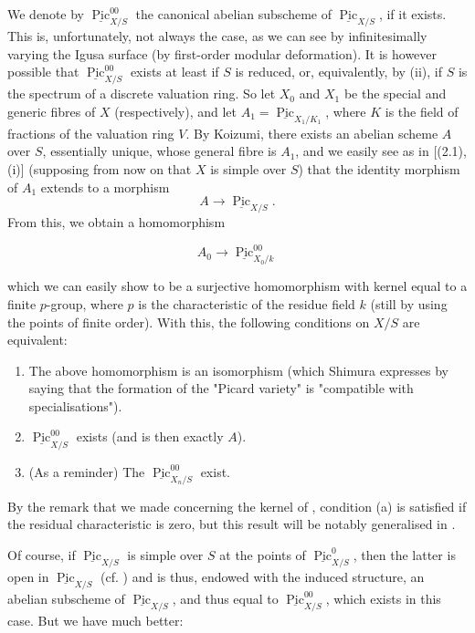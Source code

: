 \begin{remark}\label{fga3.vi-3-remarks-3.4}
    We denote by $\underline{\operatorname{Pic}}_{X/S}^{00}$ the canonical abelian subscheme of $\underline{\operatorname{Pic}}_{X/S}$, if it exists.
    This is, unfortunately, not always the case, as we can see by infinitesimally varying the Igusa surface (by first-order modular deformation).
    It is however possible that $\underline{\operatorname{Pic}}_{X/S}^{00}$ exists at least if $S$ is reduced, or, equivalently, by (ii), if $S$ is the spectrum of a discrete valuation ring.
    So let $X_0$ and $X_1$ be the special and generic fibres of $X$ (respectively), and let $A_1=\underline{\operatorname{Pic}}_{X_1/K_1}$, where $K$ is the field of fractions of the valuation ring $V$.
    By Koizumi, there exists an abelian scheme $A$ over $S$, essentially unique, whose general fibre is $A_1$, and we easily see as in [(2.1), (i)]  (supposing from now on that $X$ is simple over $S$) that the identity morphism of $A_1$ extends to a morphism
    \[
        A \to \underline{\operatorname{Pic}}_{X/S}.
    \]
    From this, we obtain a homomorphism

    \begin{equation}\tag{*}\label{fga3.vi-3-equation-star}
        A_0 \to \underline{\operatorname{Pic}}_{X_0/k}^{00}
    \end{equation}

    which we can easily show to be a surjective homomorphism with kernel equal to a finite $p$-group, where $p$ is the characteristic of the residue field $k$ (still by using the points of finite order).
    With this, the following conditions on $X/S$ are equivalent:

    \begin{enumerate}[label=\alph*.]
        \item The above homomorphism  is an isomorphism (which Shimura expresses by saying that the formation of the "Picard variety" is "compatible with specialisations").
        \item $\underline{\operatorname{Pic}}_{X/S}^{00}$ exists (and is then exactly $A$).
        \item (As a reminder) The $\underline{\operatorname{Pic}}_{X_n/S}^{00}$ exist.
    \end{enumerate}


    By the remark that we made concerning the kernel of , condition (a) is satisfied if the residual characteristic is zero, but this result will be notably generalised in .

    Of course, if $\underline{\operatorname{Pic}}_{X/S}$ is simple over $S$ at the points of $\underline{\operatorname{Pic}}_{X/S}^0$, then the latter is open in $\underline{\operatorname{Pic}}_{X/S}$ (cf. ) and is thus, endowed with the induced structure, an abelian subscheme of $\underline{\operatorname{Pic}}_{X/S}$, and thus equal to $\underline{\operatorname{Pic}}_{X/S}^{00}$, which exists in this case.
    But we have much better:
\end{remark}


